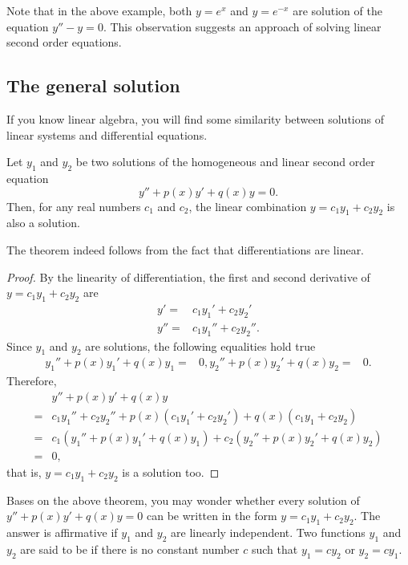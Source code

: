 Note that in the above example, both $y=e^x$ and $y=e^{-x}$ are solution of the equation $y''-y=0$. This observation suggests an approach of solving linear second order equations.

\subsection{The general solution}

If you know linear algebra, you will find some similarity between solutions of linear systems and differential equations.


\begin{theorem}
  Let $y_1$ and $y_2$ be two solutions of the homogeneous and linear second order equation
\[y'' + p(x) y' + q(x) y = 0.\]
Then, for any real numbers $c_1$ and $c_2$, the linear combination $y= c_1 y_1 + c_2 y_2$ is also a solution. 
\end{theorem}
The theorem indeed follows from the fact that differentiations are linear.
\begin{proof}
By the linearity of differentiation, the first and second derivative of $y= c_1 y_1 + c_2 y_2$ are 
\[
\begin{aligned}
y' = &c_1 y_1' + c_2 y_2'\\
y'' = &c_1 y_1'' + c_2 y_2''.
\end{aligned}
\]
Since $y_1$ and $y_2$ are solutions, the following equalities hold true
\[
  \begin{aligned}
    y_1'' + p(x) y_1' + q(x) y_1 =& 0,
    y_2'' + p(x) y_2' + q(x) y_2 =& 0.
  \end{aligned}
\]
Therefore,
\[  
\begin{aligned}
&y'' + p(x) y' + q(x) y \\
= & c_1 y_1'' + c_2 y_2'' + p(x) (c_1 y_1' + c_2 y_2') + q(x) (c_1y_1 + c_2 y_2) \\
= & c_1 (y_1'' + p(x) y_1' + q(x) y_1) + c_2( y_2'' + p(x) y_2' + q(x) y_2 ) \\
= &0,
\end{aligned}
\]
that is, $y=c_1 y_1 + c_2 y_2$ is a solution too.
\end{proof}

Bases on the above theorem, you may wonder whether every solution of $y'' + p(x) y' + q(x) y = 0$ can be written in the form $y=c_1 y_1 + c_2 y_2$. The answer is affirmative if $y_1$ and $y_2$ are linearly independent. Two functions $y_1$ and $y_2$ are said to be  if there is no constant number $c$ such that $y_1=cy_2$ or $y_2=cy_1$. 

